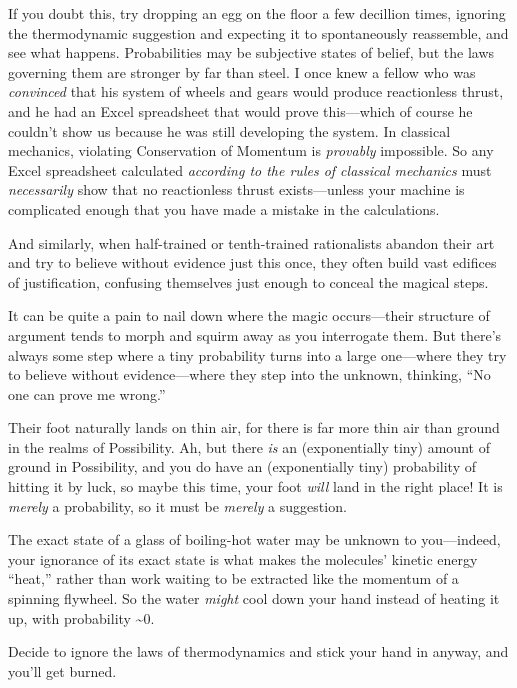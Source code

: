 {
 If you doubt this, try dropping an egg on the floor a few
decillion times, ignoring the thermodynamic suggestion and expecting it
to spontaneously reassemble, and see what happens. Probabilities may be
subjective states of belief, but the laws governing them are stronger
by far than steel. I once knew a fellow who was \textit{convinced} that
his system of wheels and gears would produce reactionless thrust, and
he had an Excel spreadsheet that would prove this---which of course he
couldn't show us because he was still developing the
system. In classical mechanics, violating Conservation of Momentum is
\textit{provably} impossible. So any Excel spreadsheet calculated
\textit{according to the rules of classical mechanics} must
\textit{necessarily} show that no reactionless thrust exists---unless
your machine is complicated enough that you have made a mistake in the
calculations.}

{
 And similarly, when half-trained or tenth-trained rationalists
abandon their art and try to believe without evidence just this once,
they often build vast edifices of justification, confusing themselves
just enough to conceal the magical steps.}

{
 It can be quite a pain to nail down where the magic occurs---their
structure of argument tends to morph and squirm away as you interrogate
them. But there's always some step where a tiny
probability turns into a large one---where they try to believe without
evidence---where they step into the unknown, thinking,
``No one can prove me wrong.''}

{
 Their foot naturally lands on thin air, for there is far more thin
air than ground in the realms of Possibility. Ah, but there \textit{is}
an (exponentially tiny) amount of ground in Possibility, and you do
have an (exponentially tiny) probability of hitting it by luck, so
maybe this time, your foot \textit{will} land in the right place! It is
\textit{merely} a probability, so it must be \textit{merely} a
suggestion.}

{
 The exact state of a glass of boiling-hot water may be unknown to
you---indeed, your ignorance of its exact state is what makes the
molecules' kinetic energy
``heat,'' rather than work waiting
to be extracted like the momentum of a spinning flywheel. So the water
\textit{might} cool down your hand instead of heating it up, with
probability \~{}0.}

{
 Decide to ignore the laws of thermodynamics and stick your hand in
anyway, and you'll get burned.}

